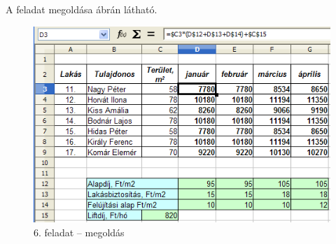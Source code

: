 A feladat megoldása  ábrán látható.

\begin{figure}[!h]
\begin{center}
\includegraphics[width=13.386cm]{oocalcv2-img31.png}
\caption{6. feladat --  megoldás}\label{6-feladatMegoldás}
\end{center}
\end{figure}


